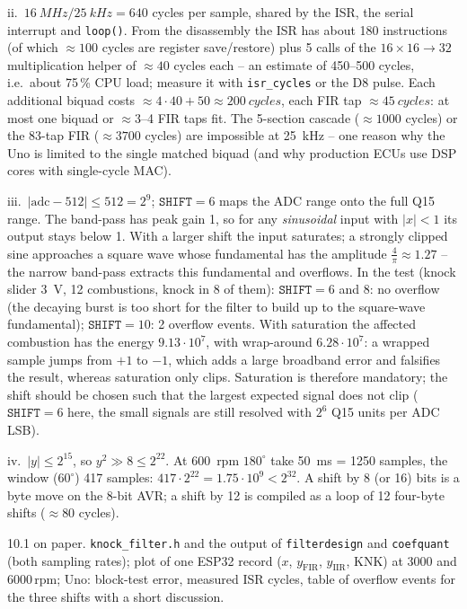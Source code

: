 \begin{solution}
ii.\ $\SI{16}{MHz}/\SI{25}{kHz}=640$ cycles per sample, shared by the ISR, the
serial interrupt and \texttt{loop()}. From the disassembly the ISR has about
180 instructions (of which $\approx100$ cycles are register save/restore) plus
5 calls of the $16\times16\to32$ multiplication helper of $\approx40$ cycles each --
an estimate of 450--500 cycles, i.e.\ about 75\,\% CPU load; measure it with
\texttt{isr\_cycles} or the D8 pulse. Each additional biquad costs
$\approx 4\cdot40+50\approx\SI{200}{cycles}$, each FIR tap $\approx\SI{45}{cycles}$:
at most one biquad or $\approx 3$--4 FIR taps fit. The 5-section cascade
($\approx1000$ cycles) or the 83-tap FIR ($\approx3700$ cycles) are impossible at
\SI{25}{kHz} -- one reason why the Uno is limited to the single matched biquad
(and why production ECUs use DSP cores with single-cycle MAC).

iii.\ $|\text{adc}-512|\le512=2^9$; $\texttt{SHIFT}=6$ maps the ADC range onto
the full Q15 range. The band-pass has peak gain 1, so for any \emph{sinusoidal}
input with $|x|<1$ its output stays below 1. With a larger shift the input
saturates; a strongly clipped sine approaches a square wave whose fundamental
has the amplitude $\tfrac4\pi\approx1.27$ -- the narrow band-pass extracts this
fundamental and overflows. In the test (knock slider \SI{3}{V}, 12 combustions,
knock in 8 of them): $\texttt{SHIFT}=6$ and 8: no overflow (the decaying burst
is too short for the filter to build up to the square-wave fundamental);
$\texttt{SHIFT}=10$: 2 overflow events. With saturation the affected combustion has the energy
$9.13\cdot10^7$, with wrap-around $6.28\cdot10^7$: a wrapped sample jumps from $+1$ to $-1$,
which adds a large broadband error and falsifies the result, whereas saturation
only clips. Saturation is therefore mandatory; the shift should be chosen such
that the largest expected signal does not clip ($\texttt{SHIFT}=6$ here, the
small signals are still resolved with $2^6$ Q15 units per ADC LSB).

iv.\ $|y|\le2^{15}$, so $y^2\gg8\le2^{22}$. At \SI{600}{rpm} $180^\circ$ take
\SI{50}{ms} = 1250 samples, the window ($60^\circ$) 417 samples:
$417\cdot2^{22}=1.75\cdot10^9<2^{32}$. A shift by 8 (or 16) bits is a byte move
on the 8-bit AVR; a shift by 12 is compiled as a loop of 12 four-byte shifts
($\approx 80$ cycles).
\end{solution}

\begin{deliverables}
10.1 on paper. \texttt{knock\_filter.h} and the output of \texttt{filterdesign}
and \texttt{coefquant} (both sampling rates); plot of one ESP32 record ($x$,
$y_\text{FIR}$, $y_\text{IIR}$, KNK) at 3000 and 6000\,rpm; Uno: block-test error,
measured ISR cycles, table of overflow events for the three shifts with a short
discussion.
\end{deliverables}
